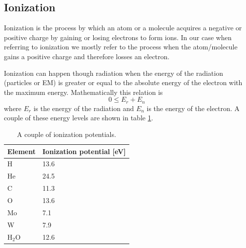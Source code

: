 \documentclass[jmp, amsmath, amssymb, reprint]{article}
\numberwithin{equation}{section}
\begin{document}
\begin{multicols}{2}
\subsection{Ionization}

Ionization is the process by which an atom or a molecule acquires a negative or positive charge by gaining or losing electrons to form ions. In our case when referring to ionization we mostly refer to the process when the atom/molecule gains a positive charge and therefore losses an electron.

Ionization can happen though radiation when the energy of the radiation (particles or EM) is greater or equal to the absolute energy of the electron with the maximum energy. Mathematically this relation is
\begin{equation}
0 \leq E_r + E_n
\end{equation}
where \(E_r\) is the energy of the radiation and \(E_n\) is the energy of the electron. A couple of these energy levels are shown in table \ref{tabel:4}.

\begin{table}[H]
  \begin{center}
    \begin{tabular}{| l | l |}
   	\hline
	Element & Ionization potential [eV]\\ \hline
	H & 13.6\\
	He & 24.5\\
	C & 11.3\\
	O & 13.6\\
	Mo & 7.1\\
	W & 7.9\\
	H\(_2\)O & 12.6\\ \hline
	\end{tabular}
    \caption{A couple of ionization potentials.}
    \label{tabel:4}
  \end{center}
\end{table}



\end{multicols}


\end{document}
